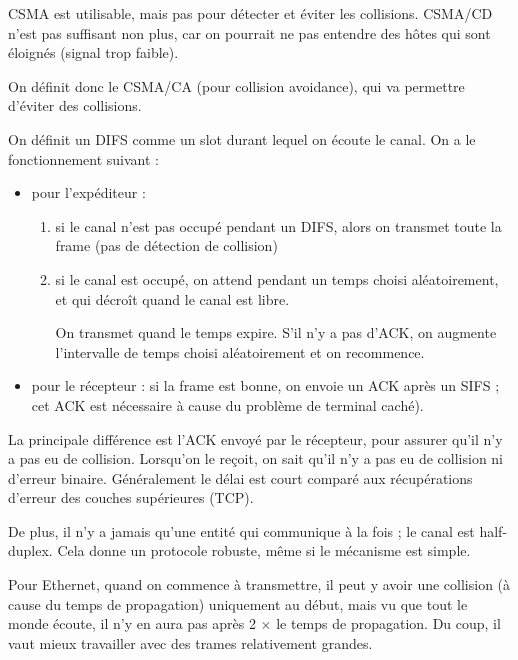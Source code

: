		CSMA est utilisable, mais pas pour détecter et éviter les collisions. CSMA/CD n'est pas suffisant non plus, car on pourrait ne pas entendre des hôtes qui sont éloignés (signal trop faible).
		
		On définit donc le CSMA/CA (pour collision avoidance), qui va permettre d'éviter des collisions. 
		
		On définit un DIFS comme un slot durant lequel on écoute le canal. On a le fonctionnement suivant :
		
		\begin{itemize}
			\item pour l'expéditeur :
			
			\begin{enumerate}
				\item si le canal n'est pas occupé pendant un DIFS, alors on transmet toute la frame (pas de détection de collision)
				\item si le canal est occupé, on attend pendant un temps choisi aléatoirement, et qui décroît quand le canal est libre.
				
				On transmet quand le temps expire. S'il n'y a pas d'ACK, on augmente l'intervalle de temps choisi aléatoirement et on recommence.
			\end{enumerate}
			
			\item pour le récepteur : si la frame est bonne, on envoie un ACK après un SIFS ; cet ACK est nécessaire à cause du problème de terminal caché).
			
		\end{itemize}
		
				
		La principale différence est l'ACK envoyé par le récepteur, pour assurer qu'il n'y a pas eu de collision. Lorsqu'on le reçoit, on sait qu'il n'y a pas eu de collision ni d'erreur binaire. Généralement le délai est court comparé aux récupérations d'erreur des couches supérieures (TCP).
		
		De plus, il n'y a jamais qu'une entité qui communique à la fois ; le canal est half-duplex. Cela donne un protocole robuste, même si le mécanisme est simple.
		
		Pour Ethernet, quand on commence à transmettre, il peut y avoir une collision (à cause du temps de propagation) uniquement au début, mais vu que tout le monde écoute, il n'y en aura pas après 2 $\times$ le temps de propagation. Du coup, il vaut mieux travailler avec des trames relativement grandes.
		
